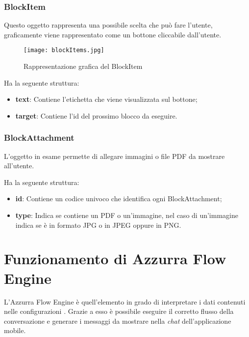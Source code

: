 \subsubsection*{BlockItem}
Questo oggetto rappresenta una possibile scelta che può fare l'utente, graficamente viene rappresentato come un bottone cliccabile dall'utente.

\begin{figure}[h]
	\centering
	\texttt{[image: blockItems.jpg]}
	\caption{Rappresentazione grafica del BlockItem}
\end{figure}
Ha la seguente struttura:

\begin{itemize}
	\item \textbf{text}: Contiene l'etichetta che viene visualizzata sul bottone;
	\item \textbf{target}: Contiene l'id del prossimo blocco da eseguire.
\end{itemize}

\subsubsection*{BlockAttachment} 
L'oggetto in esame permette di allegare immagini o file PDF da mostrare all'utente.

Ha la seguente struttura:

\begin{itemize}
	\item \textbf{id}: Contiene un codice univoco che identifica ogni BlockAttachment;
	\item \textbf{type}: Indica se contiene un PDF o un'immagine, nel caso di un'immagine indica se è in formato JPG o in JPEG oppure in PNG.
\end{itemize}	

\section{Funzionamento di Azzurra Flow Engine}
L'Azzurra Flow Engine è quell'elemento in grado di interpretare i dati contenuti nelle configurazioni . Grazie a esso è possibile eseguire il corretto flusso della conversazione e generare i messaggi da mostrare nella \emph{chat} dell'applicazione mobile. 

